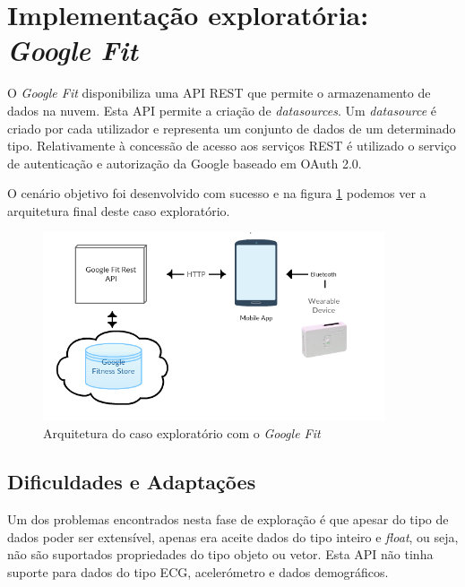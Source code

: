 \section{Implementação exploratória: \textit{Google Fit}}

O \textit{Google Fit} disponibiliza uma \gls{API} \gls{REST} que permite o armazenamento de dados na nuvem. Esta \gls{API} permite a criação  de \textit{datasources}. Um \textit{datasource} é criado por cada utilizador e representa  um conjunto de dados de um determinado tipo. Relativamente à concessão de acesso aos serviços \gls{REST} é utilizado o serviço de autenticação e autorização da Google baseado em OAuth 2.0. 
\par
O cenário objetivo foi desenvolvido com sucesso e na figura \ref{f:exp-googlefit-arch} podemos ver a arquitetura final deste caso exploratório.
\begin{figure}[H]
  \centering
  \includegraphics[width=0.9\textwidth]{imgs/googlefit-arch-exp.png}
  \caption[Arquitetura do caso exploratório com o \textit{Google Fit}]{Arquitetura do caso exploratório com o \textit{Google Fit}}
  
  \label{f:exp-googlefit-arch}
\end{figure}

\subsection{Dificuldades e Adaptações}

Um dos problemas encontrados nesta fase de exploração é que apesar do tipo de dados poder ser extensível, apenas era aceite dados do tipo inteiro e \textit{float}, ou seja, não são suportados propriedades do tipo objeto ou vetor. Esta \gls{API} não tinha suporte para dados do tipo \gls{ECG}, acelerómetro e dados demográficos.


